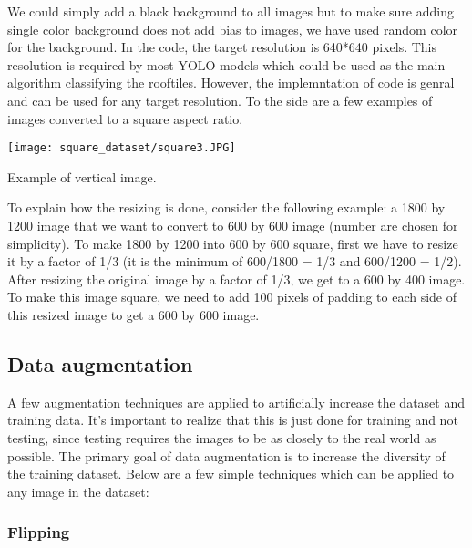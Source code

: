 We could simply add a black background to all images but to make sure adding single color background does not add bias to images, we have used random color for the background. 
In the code, the target resolution is 640*640 pixels. This resolution is required by most YOLO-models which could be used as the main algorithm classifying the rooftiles. However, the implemntation of code is genral and can be used for any target resolution. 
To the side are a few examples of images converted to a square aspect ratio.


\begin{marginfigure} %
	\texttt{[image: square\_dataset/square3.JPG]}
	\caption{Example of vertical image.}
\end{marginfigure}

To explain how the resizing is done, consider the following example: a 1800 by 1200 image that we want to convert to 600 by 600 image (number are chosen for simplicity). To make 1800 by 1200 into 600 by 600 square, first we have to resize it by a factor of 1/3 (it is the minimum of 600/1800 = 1/3 and 600/1200 = 1/2). After resizing the original image by a factor of 1/3, we get to a 600 by 400 image. To make this image square, we need to add 100 pixels of padding to each side of this resized image to get a 600 by 600 image.



\newpage
\subsection{Data augmentation}
A few augmentation techniques are applied to artificially increase the dataset and training data. 
It's important to realize that this is just done for training and not testing, 
since testing requires the images to be as closely to the real world as possible. 
The primary goal of data augmentation is to increase the diversity of the training dataset. 
Below are a few simple techniques which can be applied to any image in the dataset:

\subsubsection{Flipping}

